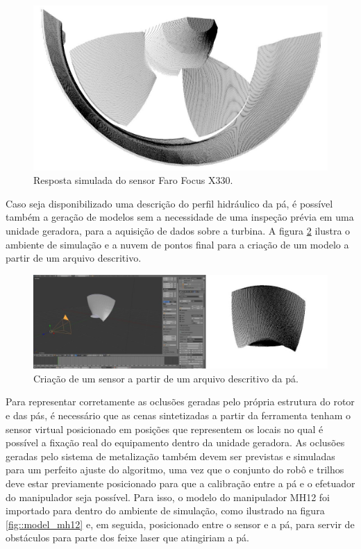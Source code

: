  \begin{figure}[H]
	\centering
	\includegraphics[width=0.9\columnwidth]{figs/calibracao/blensor_faro}
	\caption{Resposta simulada do sensor Faro Focus X330.}
    \label{fig::blensor_faro}
\end{figure}	


Caso seja disponibilizado uma descrição do perfil hidráulico da pá, é possível
também a geração de modelos sem a necessidade de uma inspeção prévia em uma
unidade geradora, para a aquisição de
dados sobre a turbina. A figura \ref{fig::modelo_pa} ilustra o ambiente de simulação e a
nuvem de pontos final para a criação de um modelo a partir de um arquivo
descritivo. 


\begin{figure}[h!]
	\centering
	\includegraphics[width=0.9\columnwidth]{figs/calibracao/blensor_pa_sim}
	\caption{Criação de um sensor a partir de um arquivo descritivo da pá.}
    \label{fig::modelo_pa}
\end{figure}

Para representar corretamente as oclusões geradas pelo própria estrutura do
rotor e das pás, é necessário que as cenas sintetizadas a partir da ferramenta
tenham o sensor virtual posicionado em posições que representem os locais no
qual é possível a fixação real do equipamento dentro da unidade geradora. As
oclusões geradas pelo sistema de metalização também devem ser previstas e simuladas para um
perfeito ajuste do algoritmo, uma vez que o conjunto do robô e trilhos deve
estar previamente posicionado para que a calibração entre a pá e o efetuador do
manipulador seja possível. Para isso, o modelo do manipulador MH12 foi
importado para dentro do ambiente de simulação, como ilustrado na figura
\ref{fig::model_mh12} e, em seguida, posicionado entre o sensor e a pá, para
servir de obstáculos para parte dos feixe laser que atingiriam a pá.


